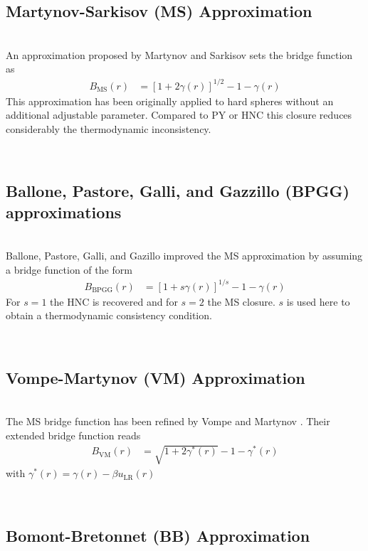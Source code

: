 \subsection{Martynov-Sarkisov (MS) Approximation}
~\\

An approximation proposed by Martynov and Sarkisov \cite{Martynov1983} sets the bridge function as
\begin{align}
B_\text{MS}(r) &= \left[1+2\gamma(r)\right]^{1/2}-1-\gamma(r)
\end{align}
This approximation has been originally applied to hard spheres without an additional adjustable parameter.
Compared to PY or HNC this closure reduces considerably the thermodynamic inconsistency.

\vphantom{.}~\\
\subsection{Ballone, Pastore, Galli, and Gazzillo (BPGG) approximations }
~\\

Ballone, Pastore, Galli, and Gazillo  \cite{Ballone1986}
improved the MS approximation by assuming a bridge function of the form
\begin{align}
B_\text{BPGG}(r) &= \left[1+s\gamma(r)\right]^{1/s}-1-\gamma(r)
\end{align}
For $s=1$ the HNC is recovered and for $s=2$ the MS closure. $s$ is used here to
obtain a thermodynamic consistency condition.

\vphantom{.}~\\
\subsection{Vompe-Martynov (VM) Approximation}
~\\

The MS bridge function \cite{Martynov1983} has been refined by Vompe and Martynov \cite{Vompe1994}.
Their extended bridge function reads
\begin{align}
B_\text{VM}(r) &= \sqrt{1+2\gamma^*(r)}-1-\gamma^*(r)
\end{align}
with $\gamma^*(r) = \gamma(r) - \beta u_\text{LR}(r)$

\vphantom{.}~\\
\subsection{Bomont-Bretonnet (BB) Approximation}
~\\

